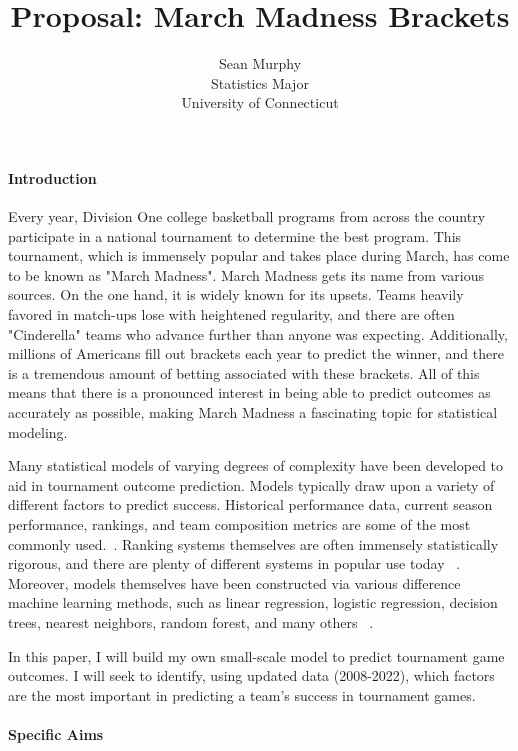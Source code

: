 \documentclass[12pt]{article}
\title{Proposal: March Madness Brackets}
\author{Sean Murphy\\
  Statistics Major\\
  University of Connecticut
}
\begin{document}
\maketitle


\paragraph{Introduction}

Every year, Division One college basketball programs from across the country participate in a national tournament to determine the best program.  This tournament, which is immensely popular and takes place during March, has come to be known as "March Madness".  March Madness gets its name from various sources.  On the one hand, it is widely known for its upsets.  Teams heavily favored in match-ups lose with heightened regularity, and there are often "Cinderella" teams who advance further than anyone was expecting.  Additionally, millions of Americans fill out brackets each year to predict the winner, and there is a tremendous amount of betting associated with these brackets.  All of this means that there is a pronounced interest in being able to predict outcomes as accurately as possible, making March Madness a fascinating topic for statistical modeling.  

Many statistical models of varying degrees of complexity have been developed to aid in tournament outcome prediction.  Models typically draw upon a variety of different factors to predict success.  Historical performance data, current season performance, rankings, and team composition metrics are some of the most commonly used.~\citep{toutkoushian2011predicting}.  Ranking systems themselves are often immensely statistically rigorous, and there are plenty of different systems in popular use today ~\citep{steinberg2018march}.  Moreover, models themselves have been constructed via various difference machine learning methods, such as linear regression, logistic regression, decision trees, nearest neighbors, random forest, and many others ~\citep{fonseca2018march}.

In this paper, I will build my own small-scale model to predict tournament game outcomes.  I will seek to identify, using updated data (2008-2022), which factors are the most important in predicting a team's success in tournament games.

\paragraph{Specific Aims}
\end{document}
